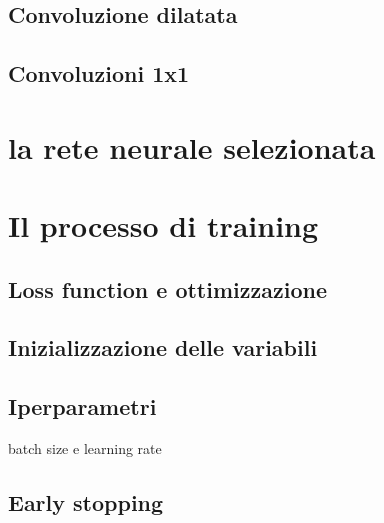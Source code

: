 \subsection{Convoluzione dilatata}
\subsection{Convoluzioni 1x1}

\section{la rete neurale selezionata}

\section{Il processo di training}
\subsection{Loss function e ottimizzazione}
\subsection{Inizializzazione delle variabili}
\subsection{Iperparametri}
batch size e learning rate
\subsection{Early stopping}